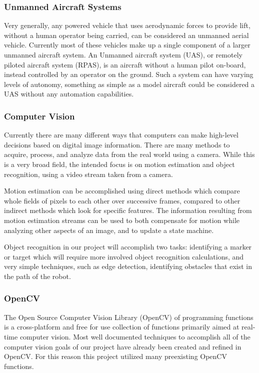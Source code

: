 \documentclass{article}[12]
\begin{document}
		\subsubsection{Unmanned Aircraft Systems}
		
		Very generally, any powered vehicle that uses aerodynamic forces to provide lift, without a human operator being carried, can be considered an unmanned aerial vehicle. Currently most of these vehicles make up a single component of a larger unmanned aircraft system. An Unmanned aircraft system (UAS), or remotely piloted aircraft system (RPAS), is an aircraft without a human pilot on-board, instead controlled by an operator on the ground. Such a system can have varying levels of autonomy, something as simple as a model aircraft could be considered a UAS without any automation capabilities.\cite{RPAS}
		
		\subsubsection{Computer Vision}
		
		Currently there are many different ways that computers can make high-level decisions based on digital image information. There are many methods to acquire, process, and analyze data from the real world using a camera. While this is a very broad field, the intended focus is on motion estimation and object recognition, using a video stream taken from a camera. 
		
		Motion estimation can be accomplished using direct methods which compare whole fields of pixels to each other over successive frames, compared to other indirect methods which look for specific features. The information resulting from motion estimation streams can be used to both compensate for motion while analyzing other aspects of an image, and to update a state machine.
		
		Object recognition in our project will accomplish two tasks: identifying a marker or target which will require more involved object recognition calculations, and very simple techniques, such as edge detection, identifying obstacles that exist in the path of the robot.
		
		\subsubsection{OpenCV}
		
		The Open Source Computer Vision Library (OpenCV) of programming functions is a cross-platform and free for use collection of functions primarily aimed at real-time computer vision.\cite{opencv} Most well documented techniques to accomplish all of the computer vision goals of our project have already been created and refined in OpenCV.\cite{woods2015dynamic} For this reason this project utilized many preexisting OpenCV functions.
		
\end{document}
